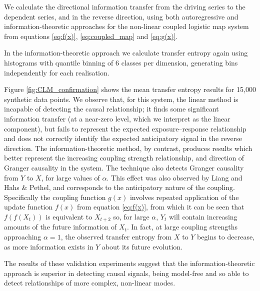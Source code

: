 \documentclass[]{rsos}%
\begin{document}
  We calculate the directional information transfer from the driving series to the dependent series, and in the reverse direction, using both autoregressive and information-theoretic approaches for the non-linear coupled logistic map system from equations \ref{eq:f(x)}, \ref{eq:coupled_map} and \ref{eq:g(x)}.  

  In the information-theoretic approach we calculate transfer entropy again using histograms with quantile binning of 6 classes per dimension, generating bins independently for each realisation.
  

  Figure \ref{fig:CLM_confirmation} shows the mean transfer entropy results for 15,000 synthetic data points. We observe that, for this system, the linear method is incapable of detecting the causal relationship; it finds some significant information transfer (at a near-zero level, which we interpret as the linear component), but fails to represent the expected exposure–response relationship and does not correctly identify the expected anticipatory signal in the reverse direction. The information-theoretic method, by contrast, produces results which better represent the increasing coupling strength relationship, and direction of Granger causality in the system. The technique also detects Granger causality from $Y$ to $X$, for large values of $\alpha$. This effect was also observed by Liang and Hahs \& Pethel, and corresponds to the anticipatory nature of the coupling. Specifically the coupling function $g(x)$ involves repeated application of the update function $f(x)$ from equation \ref{eq:f(x)}, from which it can be seen that $f(f(X_t))$ is equivalent to $X_{t+2}$ so, for large $\alpha$, $Y_t$ will contain increasing amounts of the future information of $X_t$. In fact, at large coupling strengths approaching $\alpha=1$, the observed transfer entropy from $X$ to $Y$ begins to decrease, as more information exists in $Y$ about its future evolution.

  The results of these validation experiments suggest that the information-theoretic approach is superior in detecting causal signals, being model-free and so able to detect relationships of more complex, non-linear modes.
\end{document}
